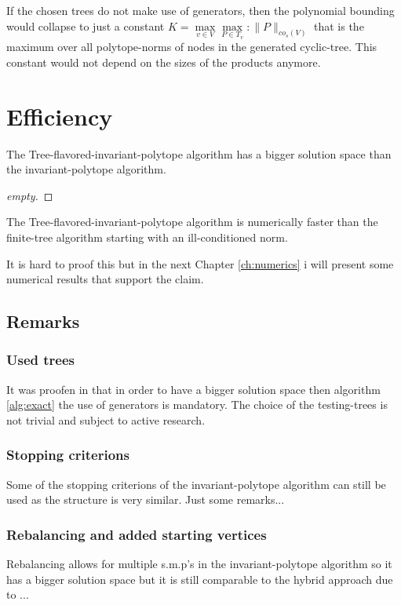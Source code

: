\begin{corollary}
  If the chosen trees do not make use of generators, then the polynomial bounding would collapse to just a constant $ K = \max\limits_{v \in V}\max\limits_{P \in T_{v}}: \lVert P \rVert _{co_{s}(V)}$ that is the maximum over all polytope-norms of nodes in the generated cyclic-tree. This constant would not depend on the sizes of the products anymore.
\end{corollary}

\section{Efficiency}

\begin{theorem}
  The Tree-flavored-invariant-polytope algorithm has a bigger solution space than the invariant-polytope algorithm.
\end{theorem}

\begin{proof}
  [empty]
\end{proof}

\begin{theorem}
  The Tree-flavored-invariant-polytope algorithm is numerically faster than the finite-tree algorithm starting with an ill-conditioned norm.
\end{theorem}

It is hard to proof this but in the next Chapter \ref{ch:numerics} i will present some numerical results that support the claim.

\subsection*{Remarks}
\subsubsection*{Used trees}
It was proofen in \citep{mollerTreebasedApproachJoint2014} that in order to have a bigger solution space then algorithm \ref{alg:exact} the use of generators is mandatory. 
The choice of the testing-trees is not trivial and subject to active research. 
\subsubsection*{Stopping criterions}
Some of the stopping criterions of the invariant-polytope algorithm can still be used as the structure is very similar. 
Just some remarks...
\subsubsection*{Rebalancing and added starting vertices}
Rebalancing allows for multiple s.m.p's in the invariant-polytope algorithm so it has a bigger solution space but it is still comparable to the hybrid approach due to ...
